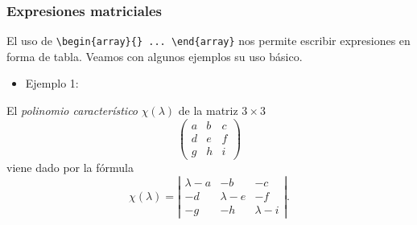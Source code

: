 \documentclass[12pt,a4paper,oneside,]{article}
\providecommand{\tightlist}{%
  \setlength{\itemsep}{0pt}\setlength{\parskip}{0pt}}
\numberwithin{dummy}{section}
\theoremstyle{ocrenumbox}
\theoremstyle{blacknumex}
\theoremstyle{blacknumbox}
\theoremstyle{ocrenum}
\theoremstyle{ocrenum}
\begin{document}
\hypertarget{expresiones-matriciales}{%
\subsubsection{Expresiones matriciales}\label{expresiones-matriciales}}

El uso de
\texttt{\textbackslash{}begin\{array\}\{\}\ ...\ \textbackslash{}end\{array\}}
nos permite escribir expresiones en forma de tabla. Veamos con algunos
ejemplos su uso básico.

\begin{itemize}
\tightlist
\item
  Ejemplo 1:
\end{itemize}

El \emph{polinomio característico} \(\chi(\lambda)\) de la matriz
\(3 \times 3\) \[ \left( \begin{array}{ccc}
a & b & c \\
d & e & f \\
g & h & i \end{array} \right)\] viene dado por la fórmula \[ 
\chi(\lambda) = 
\left| 
\begin{array}{ccc}
\lambda - a & -b & -c \\
-d & \lambda - e & -f \\
-g & -h & \lambda - i 
\end{array} 
\right|.
\]
\end{document}

